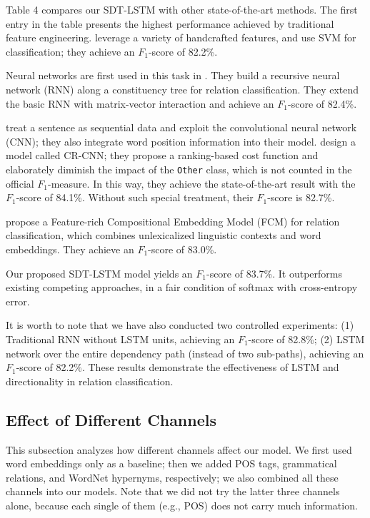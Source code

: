 \documentclass[11pt,a4paper]{article}
\begin{document}
Table 4 compares our SDT-LSTM with other state-of-the-art methods.
The first entry in the table presents
the highest performance achieved by traditional feature engineering.
 leverage a variety of handcrafted features, and use SVM for classification; they achieve an $F_1$-score of 82.2\%.

Neural networks are first used in this task in . They build
a recursive neural network (RNN) along a constituency tree for relation classification.
They extend the basic RNN with matrix-vector interaction and achieve an $F_1$-score of 82.4\%.

 treat a sentence as sequential data and exploit the convolutional neural network (CNN);
they also integrate word position information into their model. 
 design a model called CR-CNN;
they propose a ranking-based cost function and
elaborately diminish the impact of the \verb|Other| class, which
is not counted in the official $F_1$-measure.
In this way, they achieve the state-of-the-art result with the $F_1$-score of 84.1\%.
Without such special treatment, their $F_1$-score is 82.7\%.

 propose a Feature-rich Compositional Embedding Model (FCM) for relation classification, which combines unlexicalized linguistic contexts and word embeddings. They achieve an $F_1$-score of 83.0\%.


Our proposed SDT-LSTM model yields an $F_1$-score of 83.7\%. It outperforms existing competing
approaches, in a fair condition of softmax with cross-entropy error.


It is worth to note that we have also conducted two controlled experiments: 
(1) Traditional RNN without LSTM units, achieving an $F_1$-score of 82.8\%; 
(2) LSTM network over the entire dependency path (instead of two sub-paths), 
achieving an
$F_1$-score of 82.2\%. These results demonstrate the effectiveness of
LSTM and directionality in 
relation classification.

\subsection{Effect of Different Channels}\label{ssChannel}



This subsection analyzes how different channels affect our model.
We first used word embeddings only as a baseline;
then we added POS tags, grammatical relations, and WordNet hypernyms, respectively;
we also combined all these channels into our models.
Note that we did not try the latter three channels alone, 
because each single of them
(e.g., POS) does not carry much information.
\end{document}
